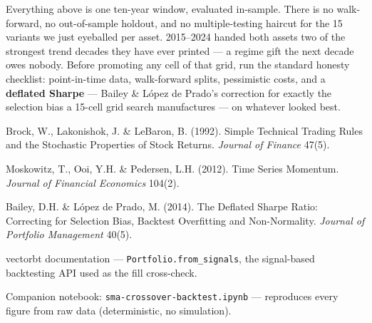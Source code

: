 \documentclass{pyportfolios-note}
\begin{document}
\noteneedroom{190bp}

Everything above is one ten-year window, evaluated in-sample. There is no
walk-forward, no out-of-sample holdout, and no multiple-testing haircut for the
15 variants we just eyeballed per asset. 2015–2024 handed both assets two of the
strongest trend decades they have ever printed — a regime gift the next decade
owes nobody. Before promoting any cell of that grid, run the standard honesty
checklist: point-in-time data, walk-forward splits, pessimistic costs, and a
\textbf{deflated Sharpe} — Bailey \& López de Prado's correction for exactly the
selection bias a 15-cell grid search manufactures — on whatever looked best.


\noteneedroom{190bp}
\begin{notereferences}
\item Brock, W., Lakonishok, J. \& LeBaron, B. (1992). Simple Technical Trading
      Rules and the Stochastic Properties of Stock Returns. \textit{Journal of
      Finance} 47(5).
\item Moskowitz, T., Ooi, Y.H. \& Pedersen, L.H. (2012). Time Series Momentum.
      \textit{Journal of Financial Economics} 104(2).
\item Bailey, D.H. \& López de Prado, M. (2014). The Deflated Sharpe Ratio:
      Correcting for Selection Bias, Backtest Overfitting and Non-Normality.
      \textit{Journal of Portfolio Management} 40(5).
\item vectorbt documentation — \texttt{Portfolio.from\_signals}, the
      signal-based backtesting API used as the fill cross-check.
\item Companion notebook: \texttt{sma-crossover-backtest.ipynb} — reproduces
      every figure from raw data (deterministic, no simulation).
\end{notereferences}
\end{document}
